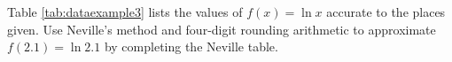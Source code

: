 %
%
%
%

\begin{example}
Table \ref{tab:dataexample3} lists the values of $f(x)=\ln x$ accurate to the places given. Use Neville's method and four-digit rounding arithmetic to approximate $f(2.1)=\ln 2.1$ by completing the Neville table.
\end{example}

